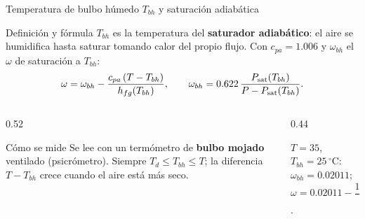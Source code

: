 \documentclass[aspectratio=169,10pt]{beamer}
\begin{document}
\begin{frame}{Temperatura de bulbo húmedo $T_{bh}$ y saturación adiabática}
\begin{cardidea}{Definición y fórmula}{\faSuperscript}
$T_{bh}$ es la temperatura del \textbf{saturador adiabático}: el aire se humidifica hasta saturar tomando calor del propio flujo. Con $c_{pa}=1.006$ y $\omega_{bh}$ el $\omega$ de saturación a $T_{bh}$:
$$\omega = \omega_{bh} - \frac{c_{pa}\,(T - T_{bh})}{h_{fg}(T_{bh})},\qquad \omega_{bh}=0.622\,\frac{P_{\rm sat}(T_{bh})}{P-P_{\rm sat}(T_{bh})}.$$
\end{cardidea}
\vspace{1.5mm}
\begin{columns}[T]
\begin{column}{0.52\textwidth}
\begin{cardgear}{Cómo se mide}{\faInfoCircle}
Se lee con un termómetro de \textbf{bulbo mojado} ventilado (psicrómetro). Siempre $T_d\le T_{bh}\le T$; la diferencia $T-T_{bh}$ crece cuando el aire está más seco.
\end{cardgear}
\end{column}
\begin{column}{0.44\textwidth}
\begin{cardnota}[\faCalculator]
$T=35$, $T_{bh}=25\,^\circ$C: $\omega_{bh}=0.02011$;\\[0.5mm]
$\omega=0.02011-\dfrac{1.006(35-25)}{2442}=0.0160$.
\end{cardnota}
\end{column}
\end{columns}
\end{frame}
\end{document}

